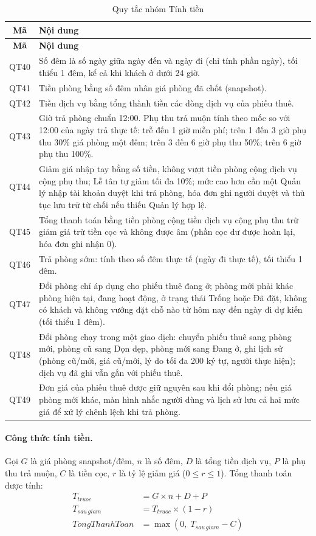 \documentclass[14pt]{report}
\begin{document}
\begin{longtable}{|c|p{12cm}|}
\caption{Quy tắc nhóm Tính tiền}\\\hline
\textbf{Mã} & \textbf{Nội dung}\\\hline
\endfirsthead
\hline \textbf{Mã} & \textbf{Nội dung}\\\hline
\endhead
QT40 & Số đêm là số ngày giữa ngày đến và ngày đi (chỉ tính phần ngày), tối thiểu 1 đêm, kể cả khi khách ở dưới 24 giờ. \\\hline
QT41 & Tiền phòng bằng số đêm nhân giá phòng đã chốt (snapshot). \\\hline
QT42 & Tiền dịch vụ bằng tổng thành tiền các dòng dịch vụ của phiếu thuê. \\\hline
QT43 & Giờ trả phòng chuẩn 12:00. Phụ thu trả muộn tính theo mốc so với 12:00 của ngày trả thực tế: trễ đến 1 giờ miễn phí; trên 1 đến 3 giờ phụ thu 30\% giá phòng một đêm; trên 3 đến 6 giờ phụ thu 50\%; trên 6 giờ phụ thu 100\%. \\\hline
QT44 & Giảm giá nhập tay bằng số tiền, không vượt tiền phòng cộng dịch vụ cộng phụ thu; Lễ tân tự giảm tối đa 10\%; mức cao hơn cần một Quản lý nhập tài khoản duyệt khi trả phòng, hóa đơn ghi người duyệt và thủ tục lưu trữ từ chối nếu thiếu Quản lý hợp lệ. \\\hline
QT45 & Tổng thanh toán bằng tiền phòng cộng tiền dịch vụ cộng phụ thu trừ giảm giá trừ tiền cọc và không được âm (phần cọc dư được hoàn lại, hóa đơn ghi nhận 0). \\\hline
QT46 & Trả phòng sớm: tính theo số đêm thực tế (ngày đi thực tế), tối thiểu 1 đêm. \\\hline
QT47 & Đổi phòng chỉ áp dụng cho phiếu thuê đang ở; phòng mới phải khác phòng hiện tại, đang hoạt động, ở trạng thái Trống hoặc Đã đặt, không có khách và không vướng đặt chỗ nào từ hôm nay đến ngày đi dự kiến (tối thiểu 1 đêm). \\\hline
QT48 & Đổi phòng chạy trong một giao dịch: chuyển phiếu thuê sang phòng mới, phòng cũ sang Dọn dẹp, phòng mới sang Đang ở, ghi lịch sử (phòng cũ/mới, giá cũ/mới, lý do tối đa 200 ký tự, người thực hiện); dịch vụ đã ghi vẫn gắn với phiếu thuê. \\\hline
QT49 & Đơn giá của phiếu thuê được giữ nguyên sau khi đổi phòng; nếu giá phòng mới khác, màn hình nhắc người dùng và lịch sử lưu cả hai mức giá để xử lý chênh lệch khi trả phòng. \\\hline
\end{longtable}

\paragraph{Công thức tính tiền.} Gọi $G$ là giá phòng snapshot/đêm, $n$ là số đêm, $D$ là tổng tiền dịch vụ, $P$ là phụ thu trả muộn, $C$ là tiền cọc, $r$ là tỷ lệ giảm giá ($0 \le r \le 1$). Tổng thanh toán được tính:
\begin{align*}
T_{truoc} &= G \times n + D + P \\
T_{sau\,giam} &= T_{truoc} \times (1 - r) \\
TongThanhToan &= \max(0,\; T_{sau\,giam} - C)
\end{align*}
\end{document}

